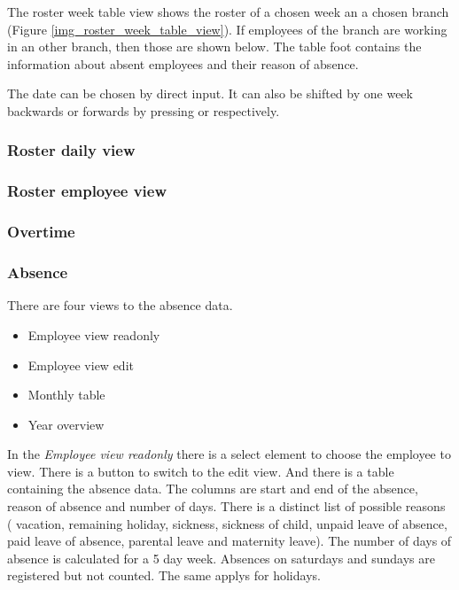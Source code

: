 The roster week table view shows the roster of a chosen week an a chosen branch (Figure \ref{img_roster_week_table_view}). If employees of the branch are working in an other branch, then those are shown below.
The table foot contains the information about absent employees and their reason of absence.

The date can be chosen by direct input. It can also be shifted by one week backwards or forwards by pressing \keys{\ctrl + \shift + $\rightarrow$} or \keys{\ctrl + \shift + $\leftarrow$} respectively.

\subsubsection{Roster daily view}
\subsubsection{Roster employee view}
\subsubsection{Overtime}
\subsubsection{Absence}
There are four views to the absence data.
\begin{itemize}
\item Employee view readonly
\item Employee view edit
\item Monthly table
\item Year overview
\end{itemize}
In the \emph{Employee view readonly} there is a select element to choose the employee to view. There is a button to switch to the edit view.
And there is a table containing the absence data. The columns are start and end of the absence, reason of absence and number of days.
There is a distinct list of possible reasons ( vacation,
        remaining holiday,
       sickness,
        sickness of child,
        unpaid leave of absence,
        paid leave of absence,
        parental leave and
        maternity leave).
The number of days of absence is calculated for a 5 day week. Absences on saturdays and sundays are registered but not counted. The same applys for holidays.